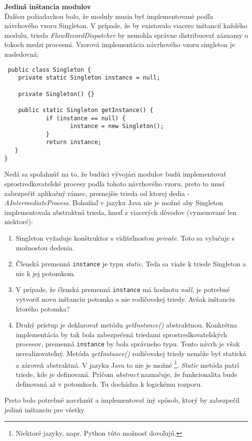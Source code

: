 \textbf{Jediná inštancia modulov} \\ \label{sec:singleton}
Ďalšou požiadavkou bolo, že moduly musia byť implementované podľa návrhového vzoru Singleton. V prípade, že
by existovalo viacero inštancií každého modulu, trieda \emph{FlowRecordDispatcher} by nemohla správne 
distribuovať záznamy o tokoch medzi procesmi. Vzorová implementácia návrhového
vzoru singleton je nasledovná:  
\begin{verbatim}
 public class Singleton {
    private static Singleton instance = null;
 
    private Singleton() {}
 
    public static Singleton getInstance() {
            if (instance == null) {
                   instance = new Singleton();
            }
            return instance;
   }
}
\end{verbatim}
Nedá sa spoľahnúť na to, že budúci vývojári modulov budú implementovať sprostredkovateľské procesy 
podľa tohoto návrhového vzoru, preto to musí zabezpečiť aplikačný rámec, presnejšie trieda od ktorej 
dedia - \emph{AIntermediateProcess}.
Bohužiaľ v jazyku Java nie je možné aby Singleton implementovala abstraktná trieda, hneď z viacerých
dôvodov (vymenované len niektoré):
\begin{enumerate}
 \item Singleton vyžaduje konštruktor s viditeľnosťou \emph{private}. Toto sa vylučuje s možnosťou 
 dedenia.
 \item Členská premenná \verb|instance| je typu \emph{static}. Teda sa viaže k triede Singleton a nie k jej 
 potomkom.
 \item V prípade, že členská premenná \verb|instance| má hodnotu \emph{null}, je potrebné vytvoriť novu inštanciu 
 potomka a nie rodičovskej triedy. Avšak inštanciu ktorého potomka?
 \item Druhý prístup je deklarovať metódu \emph{getInstance()} abstraktnou. Konkrétna implementácia 
 by tak bola zabezpečená triedami sprostredkovateľských procesov, premenná \verb|instance|
 by bola správneho typu. Tento návrh je však nerealizovateľný. 
 Metóda \emph{getInstance()} rodičovskej triedy nemôže byť statická a zároveň abstraktná. V jazyku Java
 to nie je možné \footnote{Niektoré jazyky, napr. Python túto možnosť dovoľujú.}. 
 \emph{Static} metóda patrí triede, kde je definovaná. 
 Pričom \emph{abstract} naznačuje, že funkcionalita bude definovaná až v potomkoch. Tu dochádza k 
 logickému rozporu.
\end{enumerate}
Preto bolo potrebné navrhnúť a implementovať iný spôsob, ktorý by zabezpečil jedinú inštanciu pre všetky 
